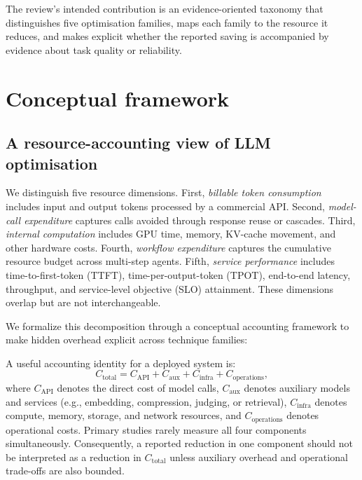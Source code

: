 \IfFileExists{jair.cls}{\documentclass{jair}}{\documentclass[manuscript,nonacm,screen]{acmart}}
\begin{document}
The review's intended contribution is an evidence-oriented taxonomy that distinguishes five optimisation families, maps each family to the resource it reduces, and makes explicit whether the reported saving is accompanied by evidence about task quality or reliability.

\section{Conceptual framework}

\subsection{A resource-accounting view of LLM optimisation}

We distinguish five resource dimensions. First, \emph{billable token consumption} includes input and output tokens processed by a commercial API. Second, \emph{model-call expenditure} captures calls avoided through response reuse or cascades. Third, \emph{internal computation} includes GPU time, memory, KV-cache movement, and other hardware costs. Fourth, \emph{workflow expenditure} captures the cumulative resource budget across multi-step agents. Fifth, \emph{service performance} includes time-to-first-token (TTFT), time-per-output-token (TPOT), end-to-end latency, throughput, and service-level objective (SLO) attainment. These dimensions overlap but are not interchangeable.

We formalize this decomposition through a conceptual accounting framework to make hidden overhead explicit across technique families:

A useful accounting identity for a deployed system is:
\[
C_{\mathrm{total}} =
C_{\mathrm{API}} + C_{\mathrm{aux}} + C_{\mathrm{infra}} + C_{\mathrm{operations}},
\]
where \(C_{\mathrm{API}}\) denotes the direct cost of model calls, \(C_{\mathrm{aux}}\) denotes auxiliary models and services (e.g., embedding, compression, judging, or retrieval), \(C_{\mathrm{infra}}\) denotes compute, memory, storage, and network resources, and \(C_{\mathrm{operations}}\) denotes operational costs. Primary studies rarely measure all four components simultaneously. Consequently, a reported reduction in one component should not be interpreted as a reduction in \(C_{\mathrm{total}}\) unless auxiliary overhead and operational trade-offs are also bounded.
\end{document}
